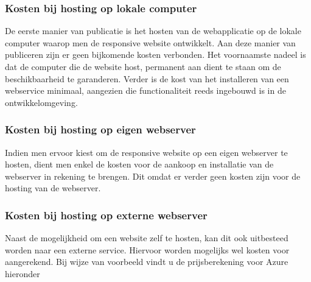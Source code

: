 \subsubsection{Kosten bij hosting op lokale computer}
De eerste manier van publicatie is het hosten van de webapplicatie op de lokale computer waarop men de responsive website
ontwikkelt. Aan deze manier van publiceren zijn er geen bijkomende kosten verbonden. Het voornaamste nadeel is dat de computer
die de website host, permanent aan dient te staan om de beschikbaarheid te garanderen. Verder is de kost van het installeren
van een webservice minimaal, aangezien die functionaliteit reeds ingebouwd is in de ontwikkelomgeving.

\subsubsection{Kosten bij hosting op eigen webserver}
Indien men ervoor kiest om de responsive website op een eigen webserver te hosten, dient men enkel de kosten voor de aankoop en installatie van de webserver in rekening te brengen.
Dit omdat er verder geen kosten zijn voor de hosting van de webserver.

\subsubsection{Kosten bij hosting op externe webserver}
Naast de mogelijkheid om een website zelf te hosten, kan dit ook uitbesteed worden naar een externe service.
Hiervoor worden mogelijks wel kosten voor aangerekend. Bij wijze van voorbeeld vindt u de prijsberekening voor Azure hieronder
